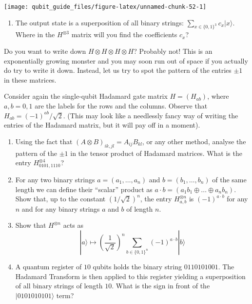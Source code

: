 \documentclass[fleqn]{article}
\providecommand{\tightlist}{%
  \setlength{\itemsep}{0pt}\setlength{\parskip}{0pt}}
\begin{document}
\begin{center}\texttt{[image: qubit\_guide\_files/figure-latex/unnamed-chunk-52-1]} \end{center}

\begin{enumerate}
\def\labelenumi{\arabic{enumi}.}
\tightlist
\item
  The output state is a superposition of all binary strings: \(\sum_{x\in\{0,1\}^3} c_x|x\rangle\).
  Where in the \(H^{\otimes 3}\) matrix will you find the coefficients \(c_x\)?
\end{enumerate}

Do you want to write down \(H\otimes H\otimes H\otimes H\)?
Probably not!
This is an exponentially growing monster and you may soon run out of space if you actually do try to write it down.
Instead, let us try to spot the pattern of the entries \(\pm1\) in these matrices.

Consider again the single-qubit Hadamard gate matrix \(H=(H_{ab})\), where \(a,b=0,1\) are the labels for the rows and the columns.
Observe that \(H_{ab}=(-1)^{ab}/\sqrt{2}\).
(This may look like a needlessly fancy way of writing the entries of the Hadamard matrix, but it will pay off in a moment).

\begin{enumerate}
\def\labelenumi{\arabic{enumi}.}
\setcounter{enumi}{1}
\item
  Using the fact that \((A\otimes B)_{ik,jl} = A_{ij}B_{kl}\), or any other method, analyse the pattern of the \(\pm1\) in the tensor product of Hadamard matrices.
  What is the entry \(H^{\otimes 4}_{0101,1110}\)?
\item
  For any two binary strings \(a=(a_1,\ldots, a_n)\) and \(b =(b_1,\ldots , b_n)\) of the same length we can define their ``scalar'' product as \(a\cdot b = (a_1b_1\oplus \ldots \oplus a_n b_n)\).
  Show that, up to the constant \((1/\sqrt{2})^n\), the entry \(H^{\otimes n}_{a,b}\) is \((-1)^{a\cdot b}\) for any \(n\) and for any binary strings \(a\) and \(b\) of length \(n\).
\item
  Show that \(H^{\otimes n}\) acts as
  \[
     |a\rangle
     \longmapsto
     \left(\frac{1}{\sqrt{2}}\right)^n
     \sum_{b\in\{0,1\}^n} (-1)^{a\cdot b}|b\rangle
   \]
\item
  A quantum register of \(10\) qubits holds the binary string \(0110101001\).
  The Hadamard Transform is then applied to this register yielding a superposition of all binary strings of length \(10\).
  What is the sign in front of the \(|0101010101\rangle\) term?
\end{enumerate}
\end{document}

